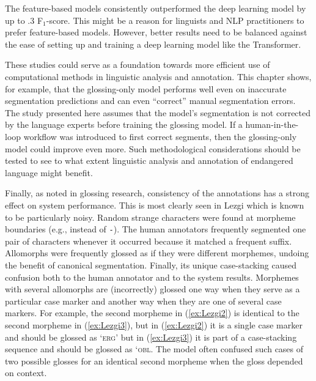 The feature-based models consistently outperformed the deep learning model by up to .3 F$_1$-score. This might be a reason for linguists and NLP practitioners to prefer feature-based models. However, better results need to be balanced against the ease of setting up and training a deep learning model like the Transformer. 

These studies could serve as a foundation towards more efficient use of computational methods in linguistic analysis and annotation. This chapter shows, for example, that the glossing-only model performs well even on inaccurate segmentation predictions and can even ``correct'' manual segmentation errors. The study presented here assumes that the model's segmentation is not corrected by the language experts before training the glossing model. If a human-in-the-loop workflow was introduced to first correct segments, then the glossing-only model could improve even more. Such methodological considerations should be tested to see to what extent linguistic analysis and annotation of endangered language might benefit.

Finally, as \citet{mcmillan-major_automating_2020} noted in glossing research, consistency of the annotations has a strong effect on system performance. This is most clearly seen in Lezgi which is known to be particularly noisy. Random strange characters were found at morpheme boundaries (e.g., {\tt *} instead of  {\tt -}). The human annotators frequently segmented one pair of characters whenever it occurred because it matched a frequent suffix. Allomorphs were frequently glossed as if they were different morphemes, undoing the benefit of canonical segmentation. Finally, its unique case-stacking caused confusion both to the human annotator and to the system results. Morphemes with several allomorphs are (incorrectly) glossed one way when they serve as a particular case marker and another way when they are one of several case markers. For example, the second morpheme in (\ref{ex:Lezgi2}) is identical to the second morpheme in (\ref{ex:Lezgi3}), but in (\ref{ex:Lezgi2}) it is a single case marker and should be glossed as `\textsc{erg}' but in (\ref{ex:Lezgi3}) it is part of a case-stacking sequence and should be glossed as `\textsc{obl}. The model often confused such cases of two possible glosses for an identical second morpheme when the gloss depended on context.

